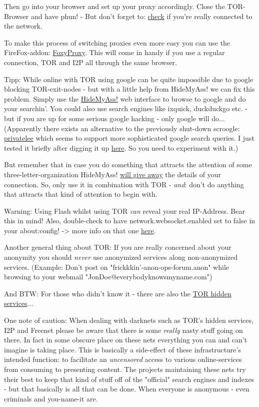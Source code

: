 \documentclass{article}
\begin{document}
 Then go into your browser and set up your proxy accordingly. Close the TOR-Browser and have phun! - But don't forget to: \href{https://check.torproject.org}{check} if you're really connected to the network.


 To make this process of switching proxies even more easy you can use the FireFox-addon: \href{https://addons.mozilla.org/en-US/firefox/addon/foxyproxy-standard/}{FoxyProxy}. This will come in handy if you use a regular connection, TOR and I2P all through the same browser. 


 Tipp: While online with TOR using google can be quite impossible due to google blocking TOR-exit-nodes - but with a little help from HideMyAss! we can fix this problem. Simply use the \href{https://www.hidemyass.com}{HideMyAss!} web interface to browse to google and do your searchin'. You could also use search engines like ixquick, duckduckgo etc. - but if you are up for some serious google hacking - only google will do... (Apparently there exists an alternative to the previously shut-down scroogle: \href{https://privatelee.qrobe.it/}{privatelee} which seems to support more sophisticated google search queries. I just tested it briefly after digging it up \href{http://crunchbang.org/forums/viewtopic.php?id=8399&amp;p=7}{here}. So you need to experiment with it.)


 But remember that in case you do something that attracts the attention of some three-letter-organization HideMyAss! \href{http://www.zdnet.com/hide-my-ass-throws-light-on-lulzsec-logs-4010024437/}{will give away} the details of your connection. So, only use it in combination with TOR - \emph{and}: don't do anything that attracts that kind of attention to begin with.


 Warning: Using Flash whilst using TOR \emph{can} reveal your real IP-Address. Bear this in mind! Also, double-check to have network.websocket.enabled set to false in your about:config! -> more info on that one \href{http://pastebin.com/xajsbiyh}{here}.


 Another general thing about TOR: If you are really concerned about your anonymity you should \emph{never} use anonymized services along non-anonymized services. (Example: Don't post on "frickkkin'-anon-ops-forum.anon" while browsing to your webmail "JonDoe@everybodyknowsmyname.com")


 And BTW: For those who didn't know it - there are also the \href{https://en.wikipedia.org/wiki/.onion}{TOR hidden services}...


 One note of caution: When dealing with darknets such as TOR's hidden services, I2P and Freenet please be aware that there is some \emph{really} nasty stuff going on there. In fact in some obscure place on these nets everything you can and can't imagine is taking place. This is basically a side-effect of these infrastructure's intended function: to facilitate an \emph{uncensored} access to various online-services from consuming to presenting content. The projects maintaining these nets try their best to keep that kind of stuff off of the "official" search engines and indexes - but that basically is all that can be done. When everyone is anonymous - even criminals and you-name-it are.
\end{document}
